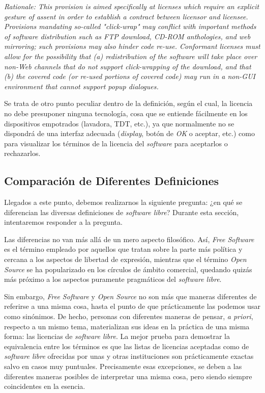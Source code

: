 \textit{Rationale: This provision is aimed specifically at licenses which
require an explicit gesture of assent in order to establish a contract between
licensor and licensee. Provisions mandating so-called "click-wrap" may conflict
with important methods of software distribution such as FTP download, CD-ROM
anthologies, and web mirroring; such provisions may also hinder code re-use.
Conformant licenses must allow for the possibility that (a) redistribution of
the software will take place over non-Web channels that do not support
click-wrapping of the download, and that (b) the covered code (or re-used
portions of covered code) may run in a non-GUI environment that cannot support
popup dialogues.}\newline

Se trata de otro punto peculiar dentro de la definición, según el cual, la
licencia no debe presuponer ninguna tecnología, cosa que se entiende
fácilmente en los dispositivos empotrados (lavadora, TDT, etc.), ya que
normalmente no se dispondrá de una interfaz adecuada (\textit{display}, botón de
\textit{OK} o aceptar, etc.) como para visualizar los términos de la licencia
del \textit{software} para aceptarlos o rechazarlos.

\subsection{Comparación de Diferentes Definiciones}

Llegados a este punto, debemos realizarnos la siguiente pregunta: ¿en qué se
diferencian las diversas definiciones de \textit{software libre}? Durante esta
sección, intentaremos responder a la pregunta.

Las diferencias no van más allá de un mero aspecto filosófico. Así, \textit{Free
Software} es el término empleado por aquellos que tratan sobre la parte más
política y cercana a los aspectos de libertad de expresión, mientras que el
término \textit{Open Source} se ha popularizado en los círculos de ámbito
comercial, quedando quizás más próximo a los aspectos puramente pragmáticos del
\textit{software libre}.

Sin embargo, \textit{Free Software} y \textit{Open Source} no son más que
maneras diferentes de referirse a una misma cosa, hasta el punto de que
prácticamente las podemos usar como sinónimos. De hecho, personas con diferentes
maneras de pensar, \textit{a priori}, respecto a un mismo tema, materializan sus
ideas en la práctica de una misma forma: las licencias de \textit{software
libre}. La mejor prueba para demostrar la equivalencia entre los términos es
que las listas de licencias aceptadas como de \textit{software libre} ofrecidas
por unas y otras instituciones son prácticamente exactas salvo en casos muy
puntuales. Precisamente esas excepciones, se deben a las diferentes maneras
posibles de interpretar una misma cosa, pero siendo siempre coincidentes en la
esencia.

